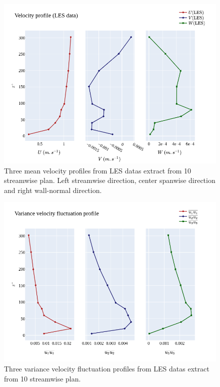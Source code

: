 \documentclass[]{article}
\theoremstyle{plain}
\theoremstyle{remark}
\begin{document}
\begin{figure}[h!]
	\begin{center}
		\includegraphics[width=\textwidth]{../output/channel_wrles_retau395/RANS/mean_velocity_profiles.png}
		\caption{Three mean velocity profiles from LES datas extract from 10 streamwise plan. Left streamwise direction, center spanwise direction and right wall-normal direction.}
	\end{center}
\end{figure}

\begin{figure}[h!]
	\begin{center}
		\includegraphics[width=\textwidth]{../output/channel_wrles_retau395/RANS/var_velocity_profiles.png}
		\caption{Three variance velocity fluctuation profiles from LES datas extract from 10 streamwise plan.}
	\end{center}
\end{figure}
\end{document}
